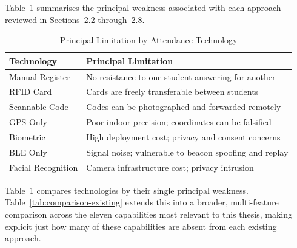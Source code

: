 \documentclass[12pt, a4paper, oneside]{report}
\begin{document}
Table~\ref{tab:limitation-by-tech} summarises the principal weakness associated with each approach reviewed in Sections~2.2 through~2.8.

\begin{table}[htbp]
\centering
\caption{Principal Limitation by Attendance Technology}
\label{tab:limitation-by-tech}
\begin{tabularx}{\textwidth}{|l|X|}
\hline
\textbf{Technology} & \textbf{Principal Limitation} \\
\hline
Manual Register & No resistance to one student answering for another \\
\hline
RFID Card & Cards are freely transferable between students \\
\hline
Scannable Code & Codes can be photographed and forwarded remotely \\
\hline
GPS Only & Poor indoor precision; coordinates can be falsified \\
\hline
Biometric & High deployment cost; privacy and consent concerns \\
\hline
BLE Only & Signal noise; vulnerable to beacon spoofing and replay \\
\hline
Facial Recognition & Camera infrastructure cost; privacy intrusion \\
\hline
\end{tabularx}
\end{table}

Table~\ref{tab:limitation-by-tech} compares technologies by their single principal weakness. Table~\ref{tab:comparison-existing} extends this into a broader, multi-feature comparison across the eleven capabilities most relevant to this thesis, making explicit just how many of these capabilities are absent from each existing approach.
\end{document}
